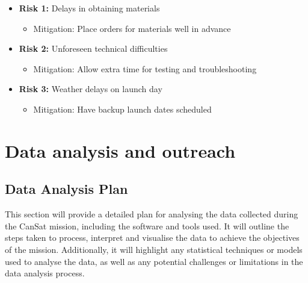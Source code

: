 \documentclass[11pt]{article}
\begin{document}
{{\begin{itemize}
    \item \textbf{Risk 1:} Delays in obtaining materials
        \begin{itemize}
        \item Mitigation: Place orders for materials well in advance
        \end{itemize}
    \item \textbf{Risk 2:} Unforeseen technical difficulties
        \begin{itemize}
        \item Mitigation: Allow extra time for testing and troubleshooting
        \end{itemize}
    \item \textbf{Risk 3:} Weather delays on launch day
        \begin{itemize}
        \item Mitigation: Have backup launch dates scheduled
        \end{itemize}
\end{itemize}
}
}

\section{Data analysis and outreach}
\subsection{Data Analysis Plan}
This section will provide a detailed plan for analysing the data collected during the CanSat mission, including the software and tools used. It will outline the steps taken to process, interpret and visualise the data to achieve the objectives of the mission. Additionally, it will highlight any statistical techniques or models used to analyse the data, as well as any potential challenges or limitations in the data analysis process.
\end{document}
